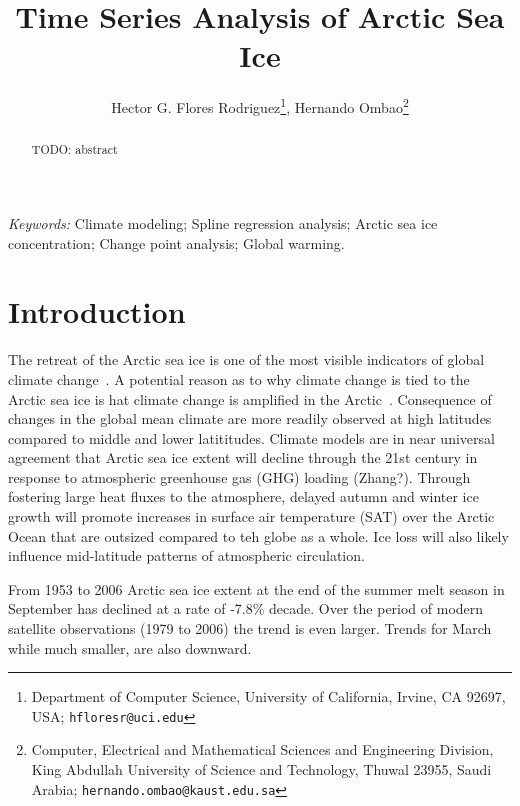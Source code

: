 \documentclass[12pt]{article}
\begin{document}
\date{}
\def\spacingset#1{\renewcommand{\baselinestretch}%
{#1}\small\normalsize} \spacingset{1}


\title{\bf Time Series Analysis of Arctic Sea Ice}
\author{Hector G. Flores Rodriguez\footnote{Department of Computer Science, University of California, Irvine, CA 92697, USA; \texttt{hfloresr@uci.edu}}, Hernando Ombao\footnote{Computer, Electrical and Mathematical Sciences and Engineering Division, King Abdullah University of Science and Technology, Thuwal 23955, Saudi Arabia; \texttt{hernando.ombao@kaust.edu.sa}}}
\maketitle


\bigskip
\begin{abstract}
TODO: abstract
\end{abstract}

\noindent%
{\it Keywords:}  Climate modeling; Spline regression analysis; Arctic sea ice concentration; Change point analysis; Global warming.
\vfill


\newpage
\spacingset{2} %
\section{Introduction}
The retreat of the Arctic sea ice is one of the most visible indicators of global climate change~\citep{zhang}. A potential reason as to why climate change is tied to the Arctic sea ice is hat climate change is amplified in the Arctic~\citep{pithan}. Consequence of changes in the global mean climate are more readily observed at high latitudes compared to middle and lower latititudes. Climate models are in near universal agreement that Arctic sea ice extent will decline through the 21st century in response to atmospheric greenhouse gas (GHG) loading (Zhang?). Through fostering large heat fluxes to the atmosphere, delayed autumn and winter ice growth will promote increases in surface air temperature (SAT) over the Arctic Ocean that are outsized compared to teh globe as a whole. Ice loss will also likely influence mid-latitude patterns of atmospheric circulation.

From 1953 to 2006 Arctic sea ice extent at the end of the summer melt season in September has declined at a rate of -7.8\% decade. Over the period of modern satellite observations (1979 to 2006) the trend is even larger. Trends for March while much smaller, are also downward.
\end{document}

